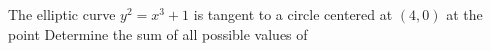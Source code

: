 The elliptic curve $y^2=x^3+1$ is tangent to a circle centered at $(4,0)$ at the point   Determine the sum of all possible values of 